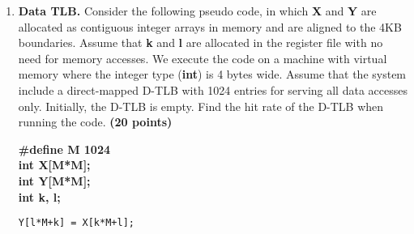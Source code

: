 \documentclass[a4paper, 11pt]{exam}
\begin{document}
\begin{enumerate}
\item \textbf{Data TLB.}
Consider the following  pseudo code, in which \textbf{X} and \textbf{Y} are allocated as contiguous integer arrays in memory and are aligned to the 4KB boundaries.
Assume that \textbf{k} and \textbf{l} are allocated in the register file with no need for memory accesses.
We execute the code on a machine with virtual memory where the integer type (\textbf{int}) is 4 bytes wide.
Assume that the system include a direct-mapped D-TLB with 1024 entries for serving all data accesses only.
Initially, the D-TLB is empty.
Find the hit rate of the D-TLB when running the code.
\textbf{(20 points)}
\begin{algorithm}
	\textbf{\#define M 1024} \\
	\textbf{int X[M*M];} \\
	\textbf{int Y[M*M];} \\
	\textbf{int k, l;}
	\begin{algorithmic}	
		\STATE \texttt{Y[l*M+k] = X[k*M+l];}
		\ENDFOR
		\ENDFOR
	\end{algorithmic}
\end{algorithm}


\end{enumerate}
\end{document}
